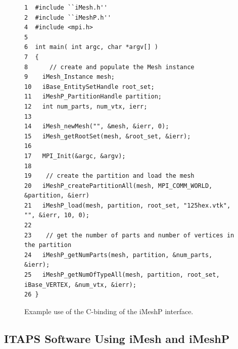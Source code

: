 \documentclass[letterpaper]{jpconf}
\begin{document}
\begin{figure}
\begin{small}
\begin{verbatim}
1  #include ``iMesh.h''
2  #include ``iMeshP.h''
4  #include <mpi.h>
5
6  int main( int argc, char *argv[] )
7  {
8      // create and populate the Mesh instance
9    iMesh_Instance mesh;
10   iBase_EntitySetHandle root_set;
11   iMeshP_PartitionHandle partition;
12   int num_parts, num_vtx, ierr;
13
14   iMesh_newMesh("", &mesh, &ierr, 0);
15   iMesh_getRootSet(mesh, &root_set, &ierr);
16
17   MPI_Init(&argc, &argv);
18
19    // create the partition and load the mesh
20   iMeshP_createPartitionAll(mesh, MPI_COMM_WORLD, &partition, &ierr)
21   iMeshP_load(mesh, partition, root_set, "125hex.vtk", "", &ierr, 10, 0);
22
23    // get the number of parts and number of vertices in the partition
24   iMeshP_getNumParts(mesh, partition, &num_parts, &ierr);
25   iMeshP_getNumOfTypeAll(mesh, partition, root_set, iBase_VERTEX, &num_vtx, &ierr); 
26 }
\end{verbatim}
\end{small}
\caption{Example use of the C-binding of the iMeshP interface.}\label{fig:imesh}
\end{figure}

\subsection{ITAPS Software Using iMesh and iMeshP}
\label{sec:software}
\end{document}
